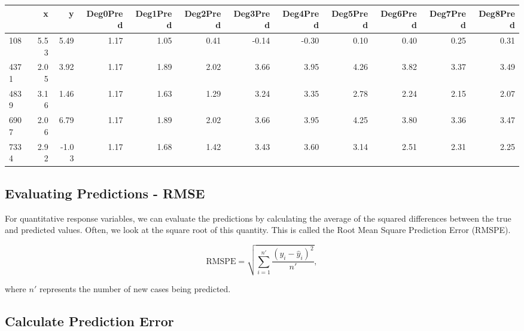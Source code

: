 \documentclass[]{book}
\begin{document}
\begin{tabular}{l|r|r|r|r|r|r|r|r|r|r|r}
\hline
  & x & y & Deg0Pred & Deg1Pred & Deg2Pred & Deg3Pred & Deg4Pred & Deg5Pred & Deg6Pred & Deg7Pred & Deg8Pred\\
\hline
108 & 5.53 & 5.49 & 1.17 & 1.05 & 0.41 & -0.14 & -0.30 & 0.10 & 0.40 & 0.25 & 0.31\\
\hline
4371 & 2.05 & 3.92 & 1.17 & 1.89 & 2.02 & 3.66 & 3.95 & 4.26 & 3.82 & 3.37 & 3.49\\
\hline
4839 & 3.16 & 1.46 & 1.17 & 1.63 & 1.29 & 3.24 & 3.35 & 2.78 & 2.24 & 2.15 & 2.07\\
\hline
6907 & 2.06 & 6.79 & 1.17 & 1.89 & 2.02 & 3.66 & 3.95 & 4.25 & 3.80 & 3.36 & 3.47\\
\hline
7334 & 2.92 & -1.03 & 1.17 & 1.68 & 1.42 & 3.43 & 3.60 & 3.14 & 2.51 & 2.31 & 2.25\\
\hline
\end{tabular}

\subsection{Evaluating Predictions -
RMSE}\label{evaluating-predictions---rmse}

For quantitative response variables, we can evaluate the predictions by
calculating the average of the squared differences between the true and
predicted values. Often, we look at the square root of this quantity.
This is called the Root Mean Square Prediction Error (RMSPE).

\[
\text{RMSPE} = \sqrt{\displaystyle\sum_{i=1}^{n'}\frac{(y_i-\hat{y}_i)^2}{n'}},
\]

where \(n'\) represents the number of new cases being predicted.

\subsection{Calculate Prediction
Error}\label{calculate-prediction-error}
\end{document}
